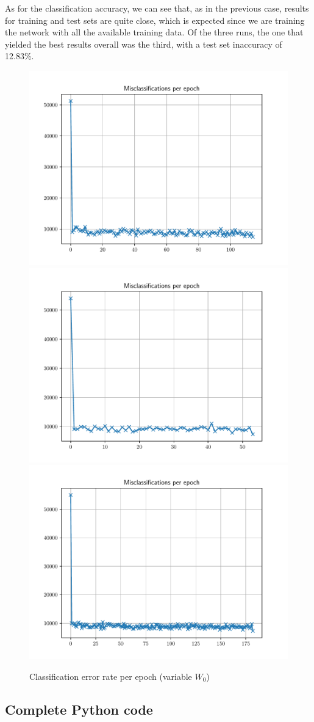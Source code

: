 \documentclass[letterpaper,headings=standardclasses]{scrartcl}
\begin{document}
As for the classification accuracy, we can see that, as in the previous case, results for training and test sets are quite close, which is expected since we are training the network with all the available training data. Of the three runs, the one that yielded the best results overall was the third, with a test set inaccuracy of 12.83\%.

\begin{figure}[h]
\centering
\includegraphics[width=.45\linewidth]{errors_60000_125_1.pdf}
\includegraphics[width=.45\linewidth]{errors_60000_125_2.pdf}
\includegraphics[width=.45\linewidth]{errors_60000_125_3.pdf}
\caption{Classification error rate per epoch (variable $W_0$)}
\label{errors_varw}
\end{figure}

\subsection{Complete Python code}


\end{document}
